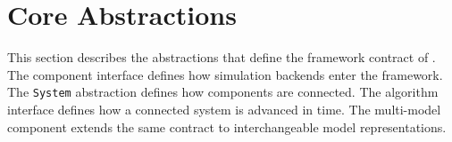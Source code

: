 \section{Core Abstractions}
\label{sec:architecture_core_abstractions}

This section describes the abstractions that define the framework contract of \syssimx{}.
The component interface defines how simulation backends enter the framework.
The \texttt{System} abstraction defines how components are connected.
The algorithm interface defines how a connected system is advanced in time.
The multi-model component extends the same contract to interchangeable model representations.





